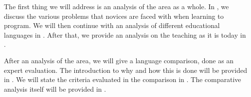 
The first thing we will address is an analysis of the area as a whole. In , we discuss the various problems that novices are faced with when learning to program. We will then continue with an analysis of different educational languages in . After that, we provide an analysis on the teaching as it is today in .

After an analysis of the area, we will give a language comparison, done as an expert evaluation. The introduction to why and how this is done will be provided in . We will state the criteria evaluated in the comparison in . The comparative analysis itself will be provided in . 





